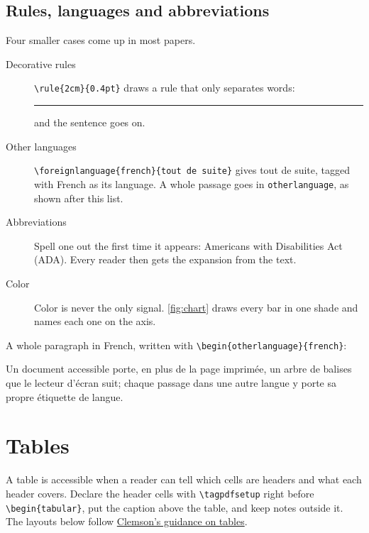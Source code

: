\documentclass[12pt]{article}
\begin{document}
\subsection{Rules, languages and abbreviations}
Four smaller cases come up in most papers.
\begin{description}
  \item[Decorative rules] \verb|\rule{2cm}{0.4pt}| draws a rule that only
    separates words: \rule{2cm}{0.4pt} and the sentence goes on.
  \item[Other languages] \verb|\foreignlanguage{french}{tout de suite}| gives
    \foreignlanguage{french}{tout de suite}, tagged with French as its
    language. A whole passage goes in \texttt{otherlanguage}, as shown after
    this list.
  \item[Abbreviations] Spell one out the first time it appears: Americans with
    Disabilities Act (ADA). Every reader then gets the expansion from the text.
  \item[Color] Color is never the only signal. \autoref{fig:chart} draws every
    bar in one shade and names each one on the axis.
\end{description}

\noindent A whole paragraph in French, written with
\verb|\begin{otherlanguage}{french}|:

\begin{otherlanguage}{french}
Un document accessible porte, en plus de la page imprim\'ee, un arbre de balises
que le lecteur d'\'ecran suit; chaque passage dans une autre langue y porte sa
propre \'etiquette de langue.
\end{otherlanguage}

\section{Tables}
\label{sec:tables}
A table is accessible when a reader can tell which cells are headers and what
each header covers. Declare the header cells with \verb|\tagpdfsetup| right
before \verb|\begin{tabular}|, put the caption above the table, and keep notes
outside it. The layouts below follow
\href{https://www.clemson.edu/accessibility/digital/concepts/tables.html}{Clemson's
guidance on tables}.
\end{document}
